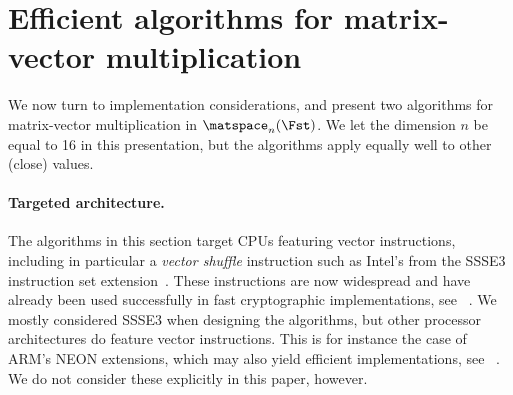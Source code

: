 \section{Efficient algorithms for matrix-vector multiplication}
\label{implem}

We now turn to implementation considerations, and present two algorithms
for matrix-vector multiplication in $\matspace_n(\Fst)$. We let the dimension
$n$ be equal to 16 in this presentation, but the algorithms apply equally well
to other (close) values.



\paragraph{Targeted architecture.}
The algorithms in this section target CPUs featuring vector instructions, including in particular a
\emph{vector shuffle} instruction such as Intel's \pshufb{} from the SSSE3 instruction set extension~\cite{ia64}. These instructions are
now widespread and have already been used successfully in fast cryptographic implementations, see \eg{}~\cite{hamburg,twine,sac2013}.
We mostly considered SSSE3 when designing the algorithms, but other processor architectures
do feature vector instructions. This is for instance the case of ARM's NEON extensions, which may also
yield efficient implementations, see \eg{}~\cite{Bernstein}. We do not consider these explicitly in this paper, however.

